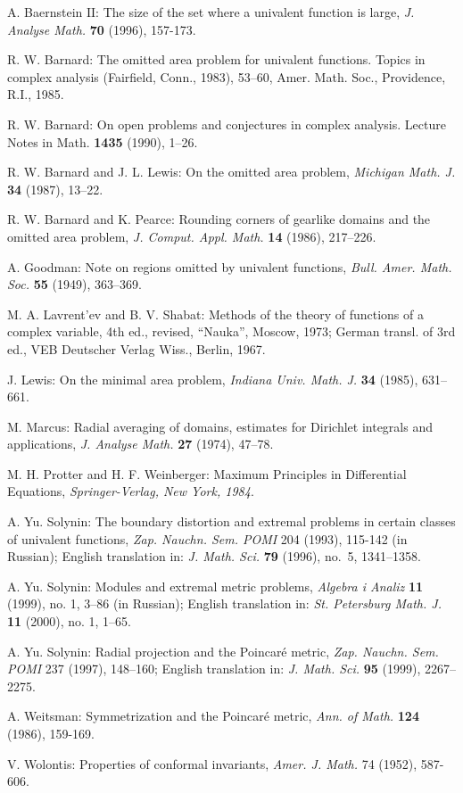 A. Baernstein $\mathrm{I\!I}$: The size of the set where a univalent function is large, \emph{J. Analyse
Math.} {\bf 70} (1996), 157-173.


R. W. Barnard: The omitted area problem for univalent functions. Topics in
complex analysis (Fairfield, Conn., 1983), 53--60, Amer. Math. Soc.,
Providence, R.I., 1985.

R. W. Barnard: On open problems and conjectures in complex
analysis. Lecture Notes in Math. {\bf 1435} (1990), 1--26.

R. W. Barnard and J. L. Lewis: On the omitted  area problem,
{\it Michigan Math. J.} {\bf 34} (1987), 13--22.

R. W. Barnard and K. Pearce: Rounding corners of gearlike domains and
the omitted  area problem,  {\it J. Comput. Appl. Math.} {\bf 14} (1986), 217--226.


A. Goodman: Note on regions omitted by univalent functions, \emph{
Bull. Amer. Math. Soc.} {\bf 55} (1949), 363--369.


M. A. Lavrent'ev and B. V. Shabat:  Methods of the theory of functions of a complex
variable,  4th ed., revised, ``Nauka'', Moscow, 1973; German transl. of 3rd ed.,
VEB Deutscher Verlag Wiss., Berlin, 1967.

J. Lewis: On the minimal area problem, {\it Indiana Univ. Math. J.} {\bf 34}
(1985), 631--661.

M. Marcus: Radial averaging of domains, estimates for Dirichlet integrals and
applications, {\it J. Analyse Math.} {\bf 27} (1974), 47--78.


M. H. Protter and H. F. Weinberger: Maximum Principles  in
Differential Equations, \emph{Springer-Verlag, New York,  1984}.

A. Yu. Solynin: The boundary distortion and extremal problems in
certain classes of univalent functions, \emph
{Zap. Nauchn. Sem. POMI} 204 (1993), 115-142 (in Russian);
English translation in: {\it J. Math. Sci.} {\bf 79} (1996),
no.~5, 1341--1358.


A. Yu. Solynin: Modules and extremal metric problems,
{\it Algebra i Analiz} {\bf 11} (1999), no. 1,
3--86 (in Russian); English translation in:
{\it St. Petersburg Math. J.} {\bf 11} (2000), no. 1, 1--65.

A. Yu. Solynin: Radial projection and the Poincar\'{e} metric, \emph
{Zap. Nauchn. Sem. POMI} 237 (1997), 148--160;
English translation in: {\it J. Math. Sci.} {\bf 95} (1999),
2267--2275.


A. Weitsman: Symmetrization and the Poincar\'{e} metric,
\emph{Ann. of Math.} {\bf 124}  (1986), 159-169.

V. Wolontis: Properties of conformal invariants, \emph{Amer. J. Math.} 74 (1952), 587-606.
